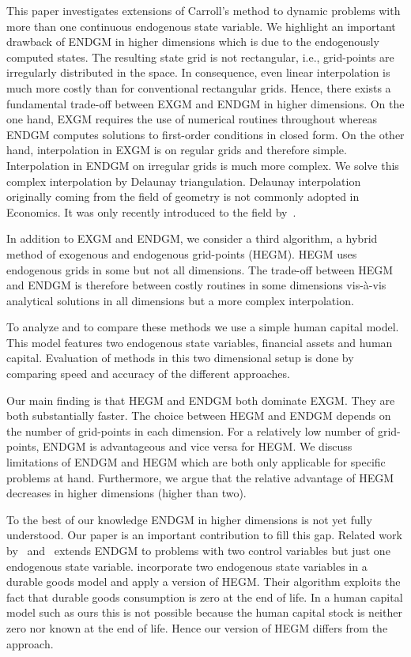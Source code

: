 \documentclass[a4paper,12pt]{article}%
\begin{document}
This paper investigates extensions of Carroll's method to dynamic problems with more than one continuous endogenous state variable. We highlight an important drawback of ENDGM in higher dimensions which is due to the endogenously computed states. The resulting state grid is not rectangular, i.e., grid-points are irregularly distributed in the space. In consequence, even linear interpolation is much more costly than for conventional rectangular grids. Hence, there exists a fundamental trade-off between EXGM and ENDGM in higher dimensions. On the one hand, EXGM requires the use of numerical routines throughout whereas ENDGM computes solutions to first-order conditions in closed form. On the other hand, interpolation in EXGM is on regular grids and therefore simple. Interpolation in ENDGM on irregular grids is much more complex. We solve this complex interpolation by Delaunay triangulation. Delaunay interpolation originally coming from the field of geometry is not commonly adopted in Economics. It was only recently introduced to the field by~.

In addition to EXGM and ENDGM, we consider a third algorithm, a hybrid method of exogenous and endogenous grid-points (HEGM). HEGM uses endogenous grids in some but not all dimensions. The trade-off between HEGM and ENDGM is therefore between costly routines in some dimensions vis-\`{a}-vis analytical solutions in all dimensions but a more complex interpolation.

To analyze and to compare these methods we use a simple human capital model. This model features two endogenous state variables, financial assets and human capital. Evaluation of methods in this two dimensional setup is done by comparing speed and accuracy of the different approaches.

Our main finding is that HEGM and ENDGM both dominate EXGM. They are both substantially faster. The choice between HEGM and ENDGM depends on the number of grid-points in each dimension. For a relatively low number of grid-points, ENDGM is advantageous and vice versa for HEGM. We discuss limitations of ENDGM and HEGM which are both only applicable for specific problems at hand. Furthermore, we argue that the relative advantage of HEGM decreases in higher dimensions (higher than two).

To the best of our knowledge ENDGM in higher dimensions is not yet fully understood. Our paper is an important contribution to fill this gap. Related work by~ and~ extends ENDGM to problems with two control variables but just one endogenous state variable.  incorporate two endogenous state variables in a durable goods model and apply a version of HEGM. Their algorithm exploits the fact that durable goods consumption is zero at the end of life. In a human capital model such as ours this is not possible because the human capital stock is neither zero nor known at the end of life. Hence our version of HEGM differs from the  approach.
\end{document}
